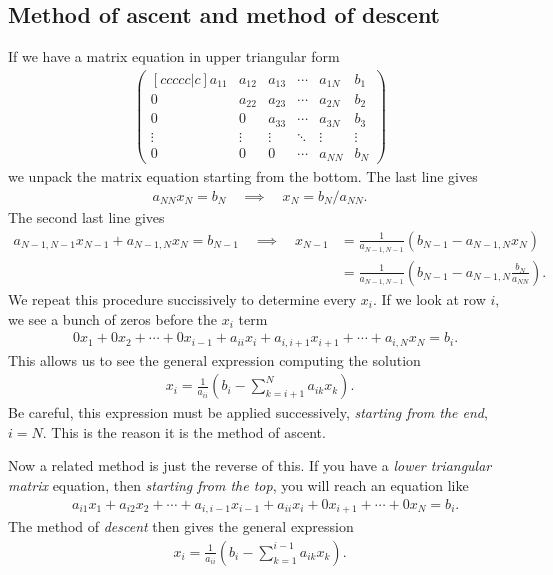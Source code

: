 \subsection{Method of ascent and method of descent}
If we have a matrix equation in upper triangular form
\begin{align*}
\begin{pmatrix}[ccccc|c]
a_{11} & a_{12} & a_{13} & \cdots & a_{1N} & b_1    \\
0      & a_{22} & a_{23} & \cdots & a_{2N} & b_2    \\
0      & 0      & a_{33} & \cdots & a_{3N} & b_3    \\
\vdots & \vdots & \vdots & \ddots & \vdots & \vdots \\
0      & 0      & 0      & \cdots & a_{NN} & b_N
\end{pmatrix}
\end{align*}
we unpack the matrix equation starting from the bottom. The last line gives
\begin{align*}
a_{NN} x_N = b_N \quad \implies \quad x_N = b_N /a_{NN}.
\end{align*}
The second last line gives
\begin{align*}
a_{N-1,N-1}x_{N-1} + a_{N-1,N} x_N = b_{N-1} \quad \implies \quad x_{N-1} & = \frac{1}{a_{N-1,N-1}}\left(b_{N-1} - a_{N-1,N}x_{N}\right) \\
& = \frac{1}{a_{N-1,N-1}}\left(b_{N-1} - a_{N-1,N} \frac{b_N}{a_{NN}} \right).
\end{align*}
We repeat this procedure succissively to determine every $x_i$. If we look at row $i$, we see a bunch of zeros before the $x_i$ term
\begin{align*}
& 0x_1 + 0 x_2 + \cdots + 0 x_{i-1} + a_{ii} x_i + a_{i,i+1} x_{i+1} + \cdots + a_{i,N} x_N = b_i.
\end{align*}
This allows us to see the general expression computing the solution
\begin{align*}
\boxed{x_i = \frac{1}{a_{ii}}\left(b_i - \sum_{k=i+1}^N a_{ik} x_{k}\right).}
\end{align*}
Be careful, this expression must be applied successively, \textit{starting from the end}, $i=N$. This is the reason it is the method of ascent.

Now a related method is just the reverse of this. If you have a \textit{lower triangular matrix} equation, then \textit{starting from the top}, you will reach an equation like
\begin{align*}
& a_{i1}x_1 + a_{i2} x_2 + \cdots + a_{i,i-1} x_{i-1} + a_{ii} x_i + 0 x_{i+1} + \cdots + 0 x_N = b_i.
\end{align*}
The method of \textit{descent} then gives the general expression
\begin{align*}
\boxed{x_i = \frac{1}{a_{ii}}\left(b_i - \sum_{k=1}^{i-1} a_{ik} x_{k}\right).}
\end{align*}


